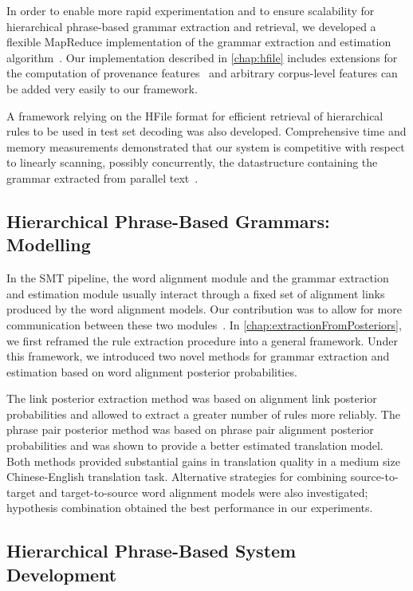 In order to enable more rapid experimentation and to ensure
scalability for hierarchical phrase-based grammar extraction
and retrieval, we developed a flexible MapReduce implementation
of the grammar extraction and estimation
algorithm~\citep{dyer-cordova-mont-lin:2008:WMT}.
Our implementation described in \autoref{chap:hfile} includes
extensions for the computation
of provenance
features~\citep{chiang-deneefe-pust:2011:ACL} and arbitrary
corpus-level features can be added very easily to our framework.

A framework relying on the HFile format
for efficient retrieval of hierarchical rules to
be used in test set decoding was also developed.
Comprehensive time and memory measurements demonstrated
that our system is competitive with respect to linearly
scanning, possibly concurrently, the datastructure containing
the grammar extracted from parallel
text~\citep{pino-waite-byrne:2012:PBML}.

\subsection{Hierarchical Phrase-Based Grammars: Modelling}

In the SMT pipeline, the word alignment module and
the grammar extraction and estimation module usually
interact through a fixed set of alignment links
produced by the word alignment models. Our contribution
was to allow for more communication between these two
modules~\citep{degispert-pino-byrne:2010:EMNLP}.
In \autoref{chap:extractionFromPosteriors}, we
first reframed the rule extraction procedure
into a general framework. Under this framework, we
introduced two novel methods for grammar extraction
and estimation based on word alignment posterior
probabilities.

The link posterior extraction method was based on alignment
link posterior probabilities and allowed to extract
a greater number of rules more reliably. The phrase pair
posterior method was based on phrase pair alignment posterior
probabilities and was shown to provide a better estimated
translation model. Both methods provided substantial gains in
translation quality in
a medium size Chinese-English translation task.
Alternative strategies for combining source-to-target
and target-to-source word alignment models were also
investigated; hypothesis combination obtained the best
performance in our experiments.

\subsection{Hierarchical Phrase-Based System Development}

